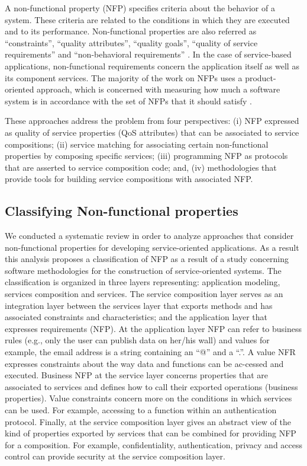 A non-functional property (NFP) specifies criteria about the behavior of a system. These criteria are related to the conditions in which they are executed and to its performance. Non-functional properties are also referred as “constraints”, “quality attributes”, “quality goals”, “quality of service requirements” and “non-behavioral requirements” \cite{StGr05}. In the case of service-based applications, non-functional requirements concern the application itself as well as its component services. 
The majority of the work on NFPs uses a product-oriented approach, which is concerned with measuring how much a software system is in accordance with the set of NFPs that it should satisfy \cite{BBKL78,FePf96,KiDa96,Lyu96,MuIO90}. 


These  approaches address the problem from four perspectives: (i) NFP expressed as quality of service properties (QoS attributes) that can be associated to service compositions; (ii) service matching for associating certain non-functional properties by composing specific services;  (iii) programming NFP as protocols that are asserted to service composition code; and, (iv) methodologies that provide tools for building service compositions with associated NFP. 

\subsection{Classifying Non-functional properties}
We conducted a systematic review \cite{placidoPhDThesis2012} in order to analyze approaches that consider non-functional properties for developing service-oriented applications. As a result this analysis proposes a classification of NFP as a result of a study concerning software methodologies for the construction of service-oriented systems. The classification is organized in three layers representing: application modeling, services composition and services. The service composition layer serves as an integration layer between the services layer that exports methods and has associated constraints and characteristics; and the application layer that expresses requirements (NFP). At the application layer NFP can refer to business rules (e.g., only the user can publish data on her/his wall) and values for example, the email address is a string containing an “@” and a “.”. A value NFR expresses constraints about the way data and functions can be ac-cessed and executed. 
Business NFP at the service layer concerns properties that are associated to services and defines how to call their exported operations (business properties).  Value constraints concern more on the conditions in which services can be used. For example, accessing to a function within an authentication protocol.
Finally, at the service composition layer gives an abstract view of the kind of properties exported by services that can be combined for providing NFP for a composition.  For example, confidentiality, authentication, privacy and access control can provide security at the service composition layer. 


